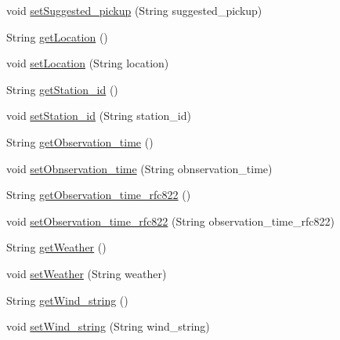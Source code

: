 \begin{DoxyCompactItemize}
\item 
void \hyperlink{classgov_1_1fnal_1_1ppd_1_1dd_1_1xml_1_1news_1_1current__observation_a5219f3afd511dc086edde0ea1d4ea7be}{set\-Suggested\-\_\-pickup} (String suggested\-\_\-pickup)
\item 
String \hyperlink{classgov_1_1fnal_1_1ppd_1_1dd_1_1xml_1_1news_1_1current__observation_a29c16d688c88d05392f2aa884f9ef73f}{get\-Location} ()
\item 
void \hyperlink{classgov_1_1fnal_1_1ppd_1_1dd_1_1xml_1_1news_1_1current__observation_a04ffc09649885682e8306799ab5c9ec1}{set\-Location} (String location)
\item 
String \hyperlink{classgov_1_1fnal_1_1ppd_1_1dd_1_1xml_1_1news_1_1current__observation_a1019ac16ae75867d31ef9341f0def951}{get\-Station\-\_\-id} ()
\item 
void \hyperlink{classgov_1_1fnal_1_1ppd_1_1dd_1_1xml_1_1news_1_1current__observation_a81e08e525a7e260026a19bfbb96bf0e9}{set\-Station\-\_\-id} (String station\-\_\-id)
\item 
String \hyperlink{classgov_1_1fnal_1_1ppd_1_1dd_1_1xml_1_1news_1_1current__observation_a06e03f0aba91701d539cc733686d7893}{get\-Observation\-\_\-time} ()
\item 
void \hyperlink{classgov_1_1fnal_1_1ppd_1_1dd_1_1xml_1_1news_1_1current__observation_a5dd4f6432217154ed7fd55a31edec01e}{set\-Obnservation\-\_\-time} (String obnservation\-\_\-time)
\item 
String \hyperlink{classgov_1_1fnal_1_1ppd_1_1dd_1_1xml_1_1news_1_1current__observation_a1b399e6a04eb87ac578567c3ee1b3963}{get\-Observation\-\_\-time\-\_\-rfc822} ()
\item 
void \hyperlink{classgov_1_1fnal_1_1ppd_1_1dd_1_1xml_1_1news_1_1current__observation_a04135c021c372ef60cf983bfb1b1a6fb}{set\-Observation\-\_\-time\-\_\-rfc822} (String observation\-\_\-time\-\_\-rfc822)
\item 
String \hyperlink{classgov_1_1fnal_1_1ppd_1_1dd_1_1xml_1_1news_1_1current__observation_af7f6d3e41f20d20d1ebe1b1577ddf885}{get\-Weather} ()
\item 
void \hyperlink{classgov_1_1fnal_1_1ppd_1_1dd_1_1xml_1_1news_1_1current__observation_a1e984358899503fda1267302f6e57888}{set\-Weather} (String weather)
\item 
String \hyperlink{classgov_1_1fnal_1_1ppd_1_1dd_1_1xml_1_1news_1_1current__observation_a5a705c5737240ba4f6e756dc161f983c}{get\-Wind\-\_\-string} ()
\item 
void \hyperlink{classgov_1_1fnal_1_1ppd_1_1dd_1_1xml_1_1news_1_1current__observation_a249b78e3ba3a9e60485e517ab8559bb8}{set\-Wind\-\_\-string} (String wind\-\_\-string)

\end{DoxyCompactItemize}
